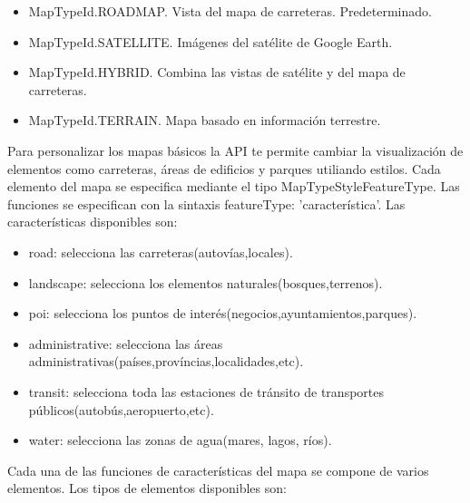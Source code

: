 \begin{itemize}

\item MapTypeId.ROADMAP. Vista del mapa de carreteras. Predeterminado.

\item MapTypeId.SATELLITE. Imágenes del satélite de Google Earth.

\item MapTypeId.HYBRID. Combina las vistas de satélite y del mapa de carreteras.

\item MapTypeId.TERRAIN. Mapa basado en información terrestre.

\end{itemize}

\vspace{5 mm}

Para personalizar los mapas básicos la API te permite cambiar la visualización de elementos como carreteras, áreas de edificios y parques utiliando estilos. Cada elemento del mapa se especifica mediante el tipo MapTypeStyleFeatureType. Las funciones se especifican con la sintaxis featureType: 'característica'. Las características disponibles son:

\begin{itemize}

\item road: selecciona las carreteras(autovías,locales).

\item landscape: selecciona los elementos naturales(bosques,terrenos).

\item poi: selecciona los puntos de interés(negocios,ayuntamientos,parques).

\item administrative: selecciona las áreas administrativas(países,províncias,localidades,etc).

\item transit: selecciona toda las estaciones de tránsito de transportes públicos(autobús,aeropuerto,etc).

\item water: selecciona las zonas de agua(mares, lagos, ríos).

\end{itemize}

\vspace{5 mm}

Cada una de las funciones de características del mapa se compone de varios elementos. Los tipos de elementos disponibles son:

